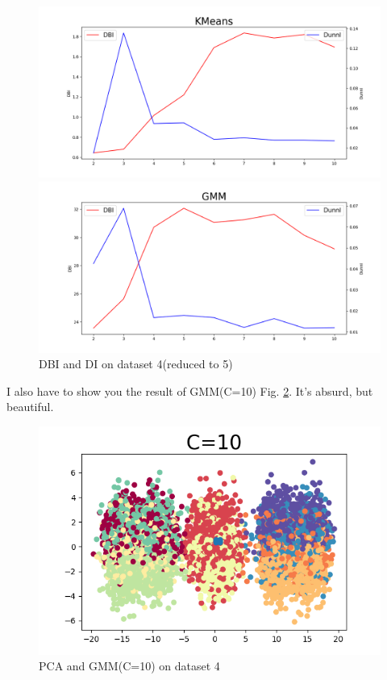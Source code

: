 \documentclass[conference]{IEEEtran}
\begin{document}
\begin{figure}[htbp]
	\centerline{\includegraphics[scale=0.3]{KM_DDI4.png}}
	\centerline{\includegraphics[scale=0.3]{GM_DDI4.png}}
	\caption{DBI and DI on dataset 4(reduced to 5)}
	\label{KMDDI4}
\end{figure}

I also have to show you the result of GMM(C=10) Fig. \ref{GMM10}. It's absurd, but beautiful.

\begin{figure}[htbp]
	\centerline{\includegraphics[scale=0.5]{4g=10.png}}
	\caption{PCA and GMM(C=10) on dataset 4}
	\label{GMM10}
\end{figure}
\end{document}
